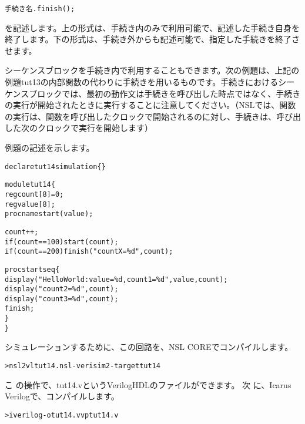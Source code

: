\begin{reviewemlist}
\begin{alltt}
手続き名.finish();
\end{alltt}
\end{reviewemlist}

を記述します。上の形式は、手続き内のみで利用可能で、記述した手続き自身を終了します。下の形式は、手続き外からも記述可能で、指定した手続きを終了させます。

シーケンスブロックを手続き内で利用することもできます。次の例題は、上記の例題tut13の内部関数の代わりに手続きを用いるものです。手続きにおけるシーケンスブロックでは、最初の動作文は手続きを呼び出した時点ではなく、手続きの実行が開始されたときに実行することに注意してください。（NSLでは、関数の実行は、関数を呼び出したクロックで開始されるのに対し、手続きは、呼び出した次のクロックで実行を開始します）

例題の記述を示します。

\begin{reviewlist}
\begin{alltt}
declare tut14 simulation \{ \}

module tut14 \{
    reg count[8] = 0;
    reg value[8];
    proc\textunderscore{}name  start(value);

    count++;
    if(count==100) start(count);
    if(count==200) \textunderscore{}finish("countX = \%d", count);

    proc start seq \{
        \textunderscore{}display("Hello World: value = \%d, count1 = \%d", value, count);
        \textunderscore{}display("count2 = \%d", count);
        \textunderscore{}display("count3 = \%d", count);
	finish;
    \}
\}
\end{alltt}
\end{reviewlist}


シミュレーションするために、この回路を、NSL COREでコンパイルします。

\begin{reviewcmd}
\begin{alltt}
\textgreater{} nsl2vl tut14.nsl -verisim2 -target tut14
\end{alltt}
\end{reviewcmd}

こ の操作で、tut14.vというVerilogHDLのファイルができます。
次 に、Icarus Verilogで、コンパイルします。

\begin{reviewcmd}
\begin{alltt}
\textgreater{} iverilog -o tut14.vvp tut14.v
\end{alltt}
\end{reviewcmd}

